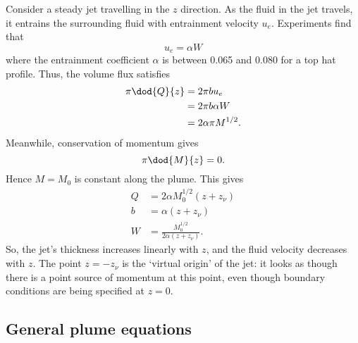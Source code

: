 Consider a steady jet travelling in the $z$ direction. As the fluid in the jet travels, it entrains the surrounding fluid with entrainment velocity $u_e$. Experiments find that
\begin{equation}
 u_e = \alpha W 
\end{equation} 
where the entrainment coefficient $\alpha$ is between 0.065 and 0.080 for a top hat profile. Thus, the volume flux satisfies
\begin{align}
 \pi \dod{Q}{z}	&= 2\pi b u_e \\
 			&= 2\pi b \alpha W \\
			&= 2\alpha\pi M^{1/2}.
\end{align}
Meanwhile, conservation of momentum gives
\begin{equation}
 \pi \dod{M}{z} = 0.
\end{equation}
Hence $M = M_0$ is constant along the plume. This gives
\begin{align}
 Q 	&= 2\alpha M_0^{1/2} (z+z_\nu) \\
 b	&= \alpha (z+z_\nu) \\
 W	&= \frac{M_0^{1/2}} {2\alpha (z+z_\nu)}.
\end{align}
So, the jet's thickness increases linearly with $z$, and the fluid velocity decreases with $z$. The point $z = -z_\nu$ is the `virtual origin' of the jet: it looks as though there is a point source of momentum at this point, even though boundary conditions are being specified at $z=0$. 

\subsection{General plume equations}

